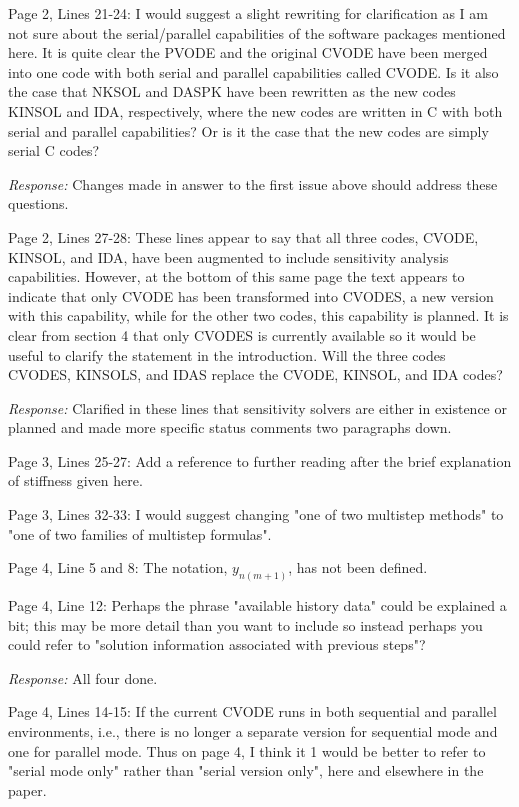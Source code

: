 \documentclass[12pt]{letter}
\begin{document}
Page 2, Lines 21-24: I would suggest a slight rewriting for
clarification as I am not sure about the serial/parallel capabilities
of the software packages mentioned here. It is quite clear the PVODE
and the original CVODE have been merged into one code with both serial
and parallel capabilities called CVODE. Is it also the case that NKSOL
and DASPK have been rewritten as the new codes KINSOL and IDA,
respectively, where the new codes are written in C with both serial
and parallel capabilities? Or is it the case that the new codes are
simply serial C codes?

{\em Response: } Changes made in answer to the first issue above
should address these questions.

Page 2, Lines 27-28: These lines appear to say that all three codes,
CVODE, KINSOL, and IDA, have been augmented to include sensitivity
analysis capabilities. However, at the bottom of this same page the
text appears to indicate that only CVODE has been transformed into
CVODES, a new version with this capability, while for the other two
codes, this capability is planned. It is clear from section 4 that
only CVODES is currently available so it would be useful to clarify
the statement in the introduction. Will the three codes CVODES,
KINSOLS, and IDAS replace the CVODE, KINSOL, and IDA codes?

{\em Response: } Clarified in these lines that sensitivity solvers
are either in existence or planned and made more specific status
comments two paragraphs down.

Page 3, Lines 25-27: Add a reference to further reading after the
brief explanation of stiffness given here.

Page 3, Lines 32-33: I would suggest changing "one of two multistep
methods" to "one of two families of multistep formulas".

Page 4, Line 5 and 8: The notation, $y_{n(m+1)}$, has not been defined.

Page 4, Line 12: Perhaps the phrase "available history data" could be
explained a bit; this may be more detail than you want to include so
instead perhaps you could refer to "solution information associated
with previous steps"?

{\em Response:} All four done.

Page 4, Lines 14-15: If the current CVODE runs in both sequential and
parallel environments, i.e., there is no longer a separate version for
sequential mode and one for parallel mode. Thus on page 4, I think it
1 would be better to refer to "serial mode only" rather than "serial
version only", here and elsewhere in the paper.
\end{document}
